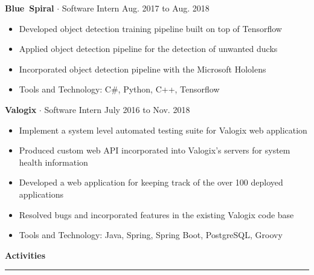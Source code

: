 \documentclass{article}
\newcommand{\rSection}[1] {
  \textcolor{header-blue} {
    \textbf{{\fontsize{0.5cm}{0.45cm}\selectfont \hbox{#1}}} \\
    \rule{0.30\textwidth}{0.1cm}
  }
}
\newcommand{\rSubSubSection}[1] {
  \textbf{{\fontsize{0.35cm}{0.45cm}\selectfont \hbox{#1}}}
}
\begin{document}
\rSubSubSection{Blue Spiral} $ \cdot $ Software Intern \hfill Aug. 2017 to Aug. 2018 \par
\vspace{-10pt}
\begin{itemize}
    \setlength\itemsep{0pt}
    \setlength{\parskip}{0pt}
    \item Developed object detection training pipeline built on top of Tensorflow
    \item Applied object detection pipeline for the detection of unwanted ducks
    \item Incorporated object detection pipeline with the Microsoft Hololens
    \item Tools and Technology: C\#, Python, C++, Tensorflow
\end{itemize}
\vspace{-10pt}

\rSubSubSection{Valogix} $ \cdot $ Software Intern \hfill July 2016 to Nov. 2018 \par
\vspace{-10pt}
\begin{itemize}
    \setlength\itemsep{0pt}
    \setlength{\parskip}{0pt}
    \item Implement a system level automated testing suite for Valogix web application
    \item Produced custom web API incorporated into Valogix's servers for system health information
    \item Developed a web application for keeping track of the over 100 deployed applications
    \item Resolved bugs and incorporated features in the existing Valogix code base
    \item Tools and Technology: Java, Spring, Spring Boot, PostgreSQL, Groovy
\end{itemize}
\vspace{-10pt}

\rSection{Activities} \par
\end{document}
